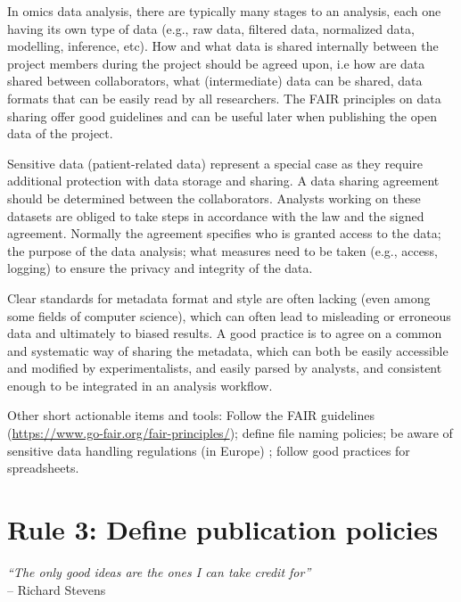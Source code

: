 \documentclass{article}
\begin{document}
In omics data analysis, there are typically many stages to an analysis, each one having its own type of data (e.g., raw data, filtered data, normalized data, modelling, inference, etc). How and what data is shared internally between the project members during the project should be agreed upon, i.e how are data shared between collaborators, what (intermediate) data can be shared, data formats that can be easily read by all researchers. The FAIR principles\cite{wilkinson2016fair} on data sharing offer good guidelines and can be useful later when publishing the open data of the project.

Sensitive data (patient-related data) represent a special case as they require additional protection with data storage and sharing.  A data sharing agreement should be determined between the collaborators. Analysts working on these datasets are obliged to take steps in accordance with the law and the signed agreement. Normally the agreement specifies who is granted access to the data; the purpose of the data analysis; what measures need to be taken (e.g., access, logging) to ensure the privacy and integrity of the data. 

Clear standards for metadata format and style are often lacking (even among some fields of computer science), which can often lead to misleading or erroneous data and ultimately to biased results. A good practice is to agree on a common and systematic way of sharing the metadata, which can both be easily accessible and modified by experimentalists, and easily parsed by analysts, and consistent enough to be integrated in an analysis workflow.  

Other short actionable items and tools: Follow the FAIR guidelines (\url{https://www.go-fair.org/fair-principles/}); define file naming policies; be aware of sensitive data handling regulations (in Europe) \cite{shabani2019reidentifiability,party2011advice}; follow good practices for spreadsheets\cite{broman2018data}.

\section*{Rule 3: Define publication policies} %
\label{rule3_publication}

\begin{flushright}
\rightskip=1cm\textit{``The only good ideas are the ones I can take credit for''} \\
\vspace{.2em}
\rightskip=0cm -- Richard Stevens
\end{flushright}
\end{document}
